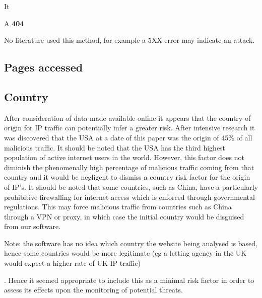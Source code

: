 It 

A \textbf{404}



No literature used this method, for example a 5XX error may indicate an attack.

\subsection{Pages accessed}

\subsection{Country}

After consideration of data made available online it appears that the country of origin for IP traffic can potentially infer a greater risk. After intensive research it was discovered that the USA at a date of this paper was the origin of 45\% of all malicious traffic. It should be noted that the USA has the third highest population of active internet users in the world. However, this factor does not diminish the phenomenally high percentage of malicious traffic coming from that country and it would be negligent to dismiss a country risk factor for the origin of IP's. It should be noted that some countries, such as China, have a particularly prohibitive firewalling for internet access which is enforced through governmental regulations. This may force malicious traffic from countries such as China through a VPN or proxy, in which case the initial country would be disguised from our software. 

Note: the software has no idea which country the website being analysed is based, hence some countries would be more legitimate (eg a letting agency in the UK would expect a higher rate of UK IP traffic)

. Hence it seemed appropriate to include this as a minimal risk factor in order to assess its effects upon the monitoring of potential threats. 


